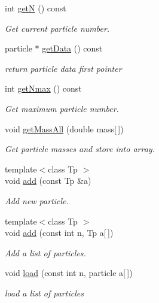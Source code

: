 \begin{DoxyCompactItemize}
int \hyperlink{classARC_1_1chainlist_a461f4b2936307305b9092a4f81197e6b}{getN} () const
\begin{DoxyCompactList}\small\item\em Get current particle number. \end{DoxyCompactList}\item 
particle $\ast$ \hyperlink{classARC_1_1chainlist_a0e19bd06e5aa685e88948c947cd06552}{get\+Data} () const
\begin{DoxyCompactList}\small\item\em return particle data first pointer \end{DoxyCompactList}\item 
int \hyperlink{classARC_1_1chainlist_a2e84ca6cff1c7be965b7771483415573}{get\+Nmax} () const
\begin{DoxyCompactList}\small\item\em Get maximum particle number. \end{DoxyCompactList}\item 
void \hyperlink{classARC_1_1chainlist_a85bba1921256d2a1a6784006927ad397}{get\+Mass\+All} (double mass\mbox{[}$\,$\mbox{]})
\begin{DoxyCompactList}\small\item\em Get particle masses and store into array. \end{DoxyCompactList}\item 
{\footnotesize template$<$class Tp $>$ }\\void \hyperlink{classARC_1_1chainlist_a598c1819d8e715ec0a24669e5bb06c6a}{add} (const Tp \&a)
\begin{DoxyCompactList}\small\item\em Add new particle. \end{DoxyCompactList}\item 
{\footnotesize template$<$class Tp $>$ }\\void \hyperlink{classARC_1_1chainlist_a1a27917b26f9be93a866dec555d5577d}{add} (const int n, Tp a\mbox{[}$\,$\mbox{]})
\begin{DoxyCompactList}\small\item\em Add a list of particles. \end{DoxyCompactList}\item 
void \hyperlink{classARC_1_1chainlist_a0b6d027aa684f6db74fa75f418dbdd70}{load} (const int n, particle a\mbox{[}$\,$\mbox{]})
\begin{DoxyCompactList}\small\item\em load a list of particles \end{DoxyCompactList}\item 

\end{DoxyCompactItemize}
